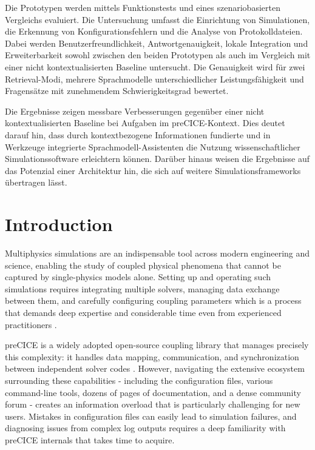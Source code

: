 \documentclass[
  numbers=noenddot,
  english,
  a4paper,
  twoside,
  bibliography=totoc,
  headsepline,
  cleardoublepage=empty,
  parskip=half,
  draft=false
]{scrbook}
\theoremstyle{break}
\renewcommand{\_}{\textunderscore\allowbreak}
\begin{document}
Die Prototypen werden mittels Funktionstests und eines szenariobasierten Vergleichs
evaluiert. Die Untersuchung umfasst die Einrichtung von Simulationen, die Erkennung
von Konfigurationsfehlern und die Analyse von Protokolldateien. Dabei werden
Benutzerfreundlichkeit, Antwortgenauigkeit, lokale Integration und Erweiterbarkeit
sowohl zwischen den beiden Prototypen als auch im Vergleich mit einer nicht
kontextualisierten Baseline untersucht. Die Genauigkeit wird für zwei Retrieval-Modi,
mehrere Sprachmodelle unterschiedlicher Leistungsfähigkeit und Fragensätze mit
zunehmendem Schwierigkeitsgrad bewertet.

Die Ergebnisse zeigen messbare Verbesserungen gegenüber einer nicht kontextualisierten
Baseline bei Aufgaben im preCICE-Kontext. Dies deutet darauf hin, dass durch
kontextbezogene Informationen fundierte und in Werkzeuge integrierte
Sprachmodell-Assistenten die Nutzung wissenschaftlicher Simulationssoftware
erleichtern können. Darüber hinaus weisen die Ergebnisse auf das Potenzial einer
Architektur hin, die sich auf weitere Simulationsframeworks übertragen lässt.


\tableofcontents
\listoffigures
\listoftables
\listoflistings

\glsaddall
\printglossary[type=\acronymtype,title={Abbreviations}]


\renewcommand*{\chapterpagestyle}{scrplain}
\pagestyle{scrheadings}


\chapter{Introduction}\label{sec:introduction}

Multiphysics simulations are an indispensable tool across modern engineering and science,
enabling the study of coupled physical phenomena that cannot be captured by single-physics
models alone.
Setting up and operating such simulations requires integrating multiple solvers, managing data
exchange between them, and carefully configuring coupling parameters which is a process that demands
deep expertise and considerable time even from experienced practitioners \cite{chourdakis2022precice}.

preCICE is a widely adopted open-source coupling library that manages precisely this
complexity: it handles data mapping, communication, and synchronization between independent
solver codes \cite{chourdakis2022precice}.
However, navigating the extensive ecosystem surrounding these capabilities - including the 
configuration files, various command-line tools, dozens of pages of documentation, and a dense 
community forum - creates an information overload that is particularly challenging for new users. 
Mistakes in configuration files can easily lead to simulation failures, and diagnosing issues 
from complex log outputs requires a deep familiarity with preCICE internals that takes  
time to acquire.
\end{document}
